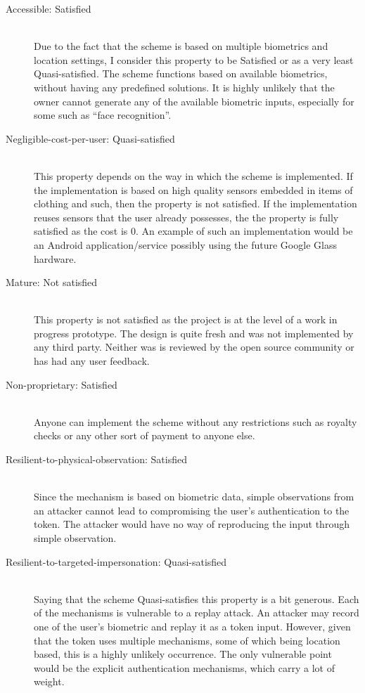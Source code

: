 \begin{description}
  \item[Accessible: Satisfied] \hfill \\
  Due to the fact that the scheme is based on multiple biometrics and location settings, I consider this property to be Satisfied or as a very least Quasi-satisfied. The scheme functions based on available biometrics, without having any predefined solutions. It is highly unlikely that the owner cannot generate any of the available biometric inputs, especially for some such as ``face recognition''.
  
  \item[Negligible-cost-per-user: Quasi-satisfied] \hfill \\
  This property depends on the way in which the scheme is implemented. If the implementation is based on high quality sensors embedded in items of clothing and such, then the property is not satisfied. If the implementation reuses sensors that the user already possesses, the the property is fully satisfied as the cost is 0. An example of such an implementation would be an Android application/service possibly using the future Google Glass hardware.
  
  \item[Mature: Not satisfied] \hfill \\
  This property is not satisfied as the project is at the level of a work in progress prototype. The design is quite fresh and was not implemented by any third party. Neither was is reviewed by the open source community or has had any user feedback.
  
  \item[Non-proprietary: Satisfied] \hfill \\
  Anyone can implement the scheme without any restrictions such as royalty checks or any other sort of payment to anyone else.
  
  \item[Resilient-to-physical-observation: Satisfied] \hfill \\
  Since the mechanism is based on biometric data, simple observations from an attacker cannot lead to compromising the user's authentication to the token. The attacker would have no way of reproducing the input through simple observation.
  
  \item[Resilient-to-targeted-impersonation: Quasi-satisfied] \hfill \\
  Saying that the scheme Quasi-satisfies this property is a bit generous. Each of the mechanisms is vulnerable to a replay attack. An attacker may record one of the user's biometric and replay it as a token input. However, given that the token uses multiple mechanisms, some of which being location based, this is a highly unlikely occurrence. The only vulnerable point would be the explicit authentication mechanisms, which carry a lot of weight.
  

\end{description}

